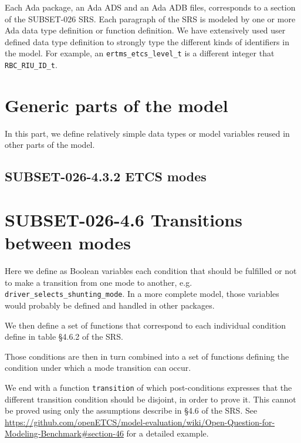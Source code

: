 \documentclass{template/openetcs_report}
\newcommand{\Ada}[1]{\lstinline[language=Ada,basicstyle={\sffamily},framesep=0pt]{#1}}
\begin{document}
Each Ada package, an Ada ADS and an Ada ADB files, corresponds to a
section of the SUBSET-026 SRS. Each paragraph of the SRS is modeled by
one or more Ada data type definition or function definition. We have
extensively used user defined data type definition to strongly type
the different kinds of identifiers in the model. For example, an
\Ada{ertms_etcs_level_t} is a different integer that
\Ada{RBC_RIU_ID_t}.


\section{Generic parts of the model}

In this part, we define relatively simple data types or model
variables reused in other parts of the model.






\subsection{SUBSET-026-4.3.2 ETCS modes}




\section{SUBSET-026-4.6 Transitions between modes}

Here we define as Boolean variables each condition that should be
fulfilled or not to make a transition from one mode to another,
e.g. \Ada{driver_selects_shunting_mode}. In a more complete model,
those variables would probably be defined and handled in other
packages.

We then define a set of functions that correspond to each individual
condition define in table §4.6.2 of the SRS.

Those conditions are then in turn combined into a set of functions
defining the condition under which a mode transition can occur.

We end with a function \Ada{transition} of which post-conditions
expresses that the different transition condition should be disjoint,
in order to prove it. This cannot be proved using only the assumptions
describe in §4.6 of the SRS. See
\url{https://github.com/openETCS/model-evaluation/wiki/Open-Question-for-Modeling-Benchmark#section-46}
for a detailed example.
\end{document}
